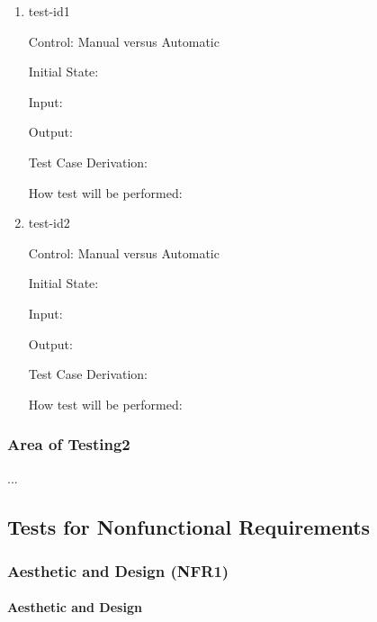 \documentclass[12pt, titlepage]{article}
\begin{document}
\begin{enumerate}

\item{test-id1\\}

Control: Manual versus Automatic
					
Initial State: 
					
Input: 
					
Output: 

Test Case Derivation: 
					
How test will be performed: 
					
\item{test-id2\\}

Control: Manual versus Automatic
					
Initial State: 
					
Input: 
					
Output: 

Test Case Derivation: 

How test will be performed: 

\end{enumerate}

\subsubsection{Area of Testing2}

...

\subsection{Tests for Nonfunctional Requirements}

\subsubsection{Aesthetic and Design (NFR1)}
		
\paragraph{Aesthetic and Design}
\end{document}
